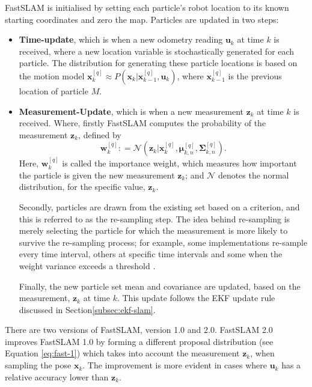 FastSLAM is initialised by setting each particle's robot location to its known starting coordinates and zero the map. Particles are updated in two steps:
\begin{itemize}
    \item \textbf{Time-update}, which is when a new odometry reading $\mathbf{u}_k$ at time $k$ is received, where a new location variable is stochastically generated for each particle. The distribution for generating these particle locations is based on the motion model $\mathbf{x}_k^{[q]} \approx P(\mathbf{x}_k | \mathbf{x}_{k-1}^{[q]}, \mathbf{u}_k)$, where $\mathbf{x}_{k-1}^{[q]}$ is the previous location of particle $M$. 
    \item \textbf{Measurement-Update}, which is when a new measurement $\mathbf{z}_k$ at time $k$ is received. Where, firstly FastSLAM computes the probability of the measurement $\mathbf{z}_k$, defined by 
    \begin{equation}
    \mathbf{w}_k^{[q]} \colon = \mathcal{N}(\mathbf{z}_k | \mathbf{x}_k^{[q]}, \mathbf{\mu}_{k,n}^{[q]}, \mathbf{\Sigma}_{k,n}^{[q]}). 
    \end{equation}
    Here, $\mathbf{w}_k^{[q]}$ is called the importance weight, which measures how important the particle is given the new measurement $\mathbf{z}_k$; and $\mathcal{N}$ denotes the normal distribution, for the specific value, $\mathbf{z}_k$. 
    
    Secondly, particles are drawn from the existing set based on a criterion, and this is referred to as the re-sampling step. The idea behind re-sampling is merely selecting the particle for which the measurement is more likely to survive the re-sampling process; for example, some implementations re-sample every time interval, others at specific time intervals and some when the weight variance exceeds a threshold \cite{Thrun2002}. 
    
    Finally, the new particle set mean and covariance are updated, based on the measurement, $\mathbf{z}_k$ at time $k$. This update follows the EKF update rule discussed in Section\ref{subsec:ekf-slam}.
\end{itemize}


There are two versions of FastSLAM, version 1.0\cite{Montemerlo2002} and 2.0\cite{Montemerlo2003}. FastSLAM 2.0 improves FastSLAM 1.0 by forming a different proposal distribution (see Equation \ref{eq:fast-1}) which takes into account the measurement $\mathbf{z}_k$, when sampling the pose $\mathbf{x}_k$. The improvement is more evident in cases where $\mathbf{u}_k$ has a relative accuracy lower than $\mathbf{z}_k$. 

